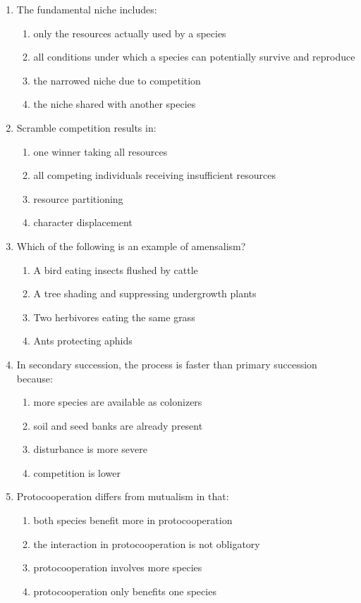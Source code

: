 \documentclass[11pt]{article}
\begin{document}
\begin{enumerate}[label=\textbf{\arabic*.}]
\item The fundamental niche includes:
\begin{enumerate}[label=\Alph*.]
  \item only the resources actually used by a species
  \item all conditions under which a species can potentially survive and reproduce
  \item the narrowed niche due to competition
  \item the niche shared with another species
\end{enumerate}

\item Scramble competition results in:
\begin{enumerate}[label=\Alph*.]
  \item one winner taking all resources
  \item all competing individuals receiving insufficient resources
  \item resource partitioning
  \item character displacement
\end{enumerate}

\item Which of the following is an example of amensalism?
\begin{enumerate}[label=\Alph*.]
  \item A bird eating insects flushed by cattle
  \item A tree shading and suppressing undergrowth plants
  \item Two herbivores eating the same grass
  \item Ants protecting aphids
\end{enumerate}

\item In secondary succession, the process is faster than primary succession because:
\begin{enumerate}[label=\Alph*.]
  \item more species are available as colonizers
  \item soil and seed banks are already present
  \item disturbance is more severe
  \item competition is lower
\end{enumerate}

\item Protocooperation differs from mutualism in that:
\begin{enumerate}[label=\Alph*.]
  \item both species benefit more in protocooperation
  \item the interaction in protocooperation is not obligatory
  \item protocooperation involves more species
  \item protocooperation only benefits one species
\end{enumerate}


\end{enumerate}
\end{document}
